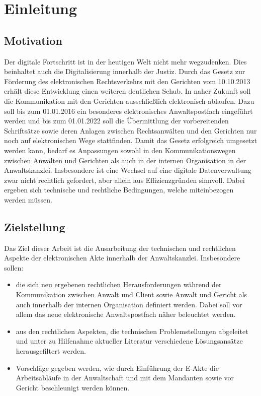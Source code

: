 \section{Einleitung}

\subsection{Motivation}
Der digitale Fortschritt ist in der heutigen Welt nicht mehr wegzudenken. Dies beinhaltet auch die Digitalisierung innerhalb der Justiz. Durch das Gesetz zur Förderung des elektronischen Rechtsverkehrs mit den Gerichten vom 10.10.2013 erhält diese Entwicklung einen weiteren deutlichen Schub. In naher Zukunft soll die Kommunikation mit den Gerichten ausschließlich elektronisch ablaufen. Dazu soll bis zum 01.01.2016 ein besonderes elektronisches Anwaltspostfach eingeführt werden und bis zum 01.01.2022 soll die Übermittlung der vorbereitenden Schriftsätze sowie deren Anlagen zwischen Rechtsanwälten und den Gerichten nur noch auf elektronischen Wege stattfinden. 
Damit das Gesetz erfolgreich umgesetzt werden kann, bedarf es Anpassungen sowohl in den Kommunikationswegen zwischen Anwälten und Gerichten als auch in der internen Organisation in der Anwaltskanzlei. Insbesondere ist eine Wechsel auf eine digitale Datenverwaltung zwar nicht rechtlich gefordert, aber allein aus Effizienzgründen sinnvoll. Dabei ergeben sich technische und rechtliche Bedingungen, welche miteinbezogen werden müssen.  

\subsection{Zielstellung}
Das Ziel dieser Arbeit ist die Ausarbeitung der technischen und rechtlichen Aspekte der elektronischen Akte innerhalb der Anwaltskanzlei. Insbesondere sollen:
\begin{itemize}
\item die sich neu ergebenen rechtlichen Herausforderungen während der Kommunikation zwischen Anwalt und Client sowie Anwalt und Gericht als auch innerhalb der internen Organisation definiert werden.  Dabei soll vor allem das neue elektronische Anwaltspostfach näher beleuchtet werden.
\item aus den rechtlichen Aspekten, die technischen Problemstellungen abgeleitet und unter zu Hilfenahme aktueller Literatur verschiedene Lösungsansätze herausgefiltert werden.
\item  Vorschläge gegeben werden, wie durch Einführung der E-Akte die Arbeitsabläufe in der Anwaltschaft und mit dem Mandanten sowie vor Gericht beschleunigt werden können.
\end{itemize} 
